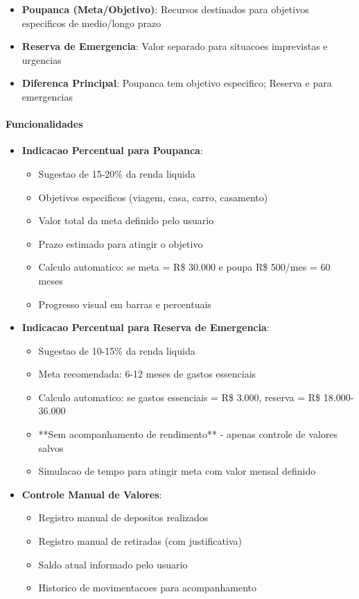 \begin{itemize}
    \item \textbf{Poupanca (Meta/Objetivo)}: Recursos destinados para objetivos especificos de medio/longo prazo
    \item \textbf{Reserva de Emergencia}: Valor separado para situacoes imprevistas e urgencias
    \item \textbf{Diferenca Principal}: Poupanca tem objetivo especifico; Reserva e para emergencias
\end{itemize}

\paragraph{Funcionalidades}
\begin{itemize}
    \item \textbf{Indicacao Percentual para Poupanca}:
    \begin{itemize}
        \item Sugestao de 15-20\% da renda liquida
        \item Objetivos especificos (viagem, casa, carro, casamento)
        \item Valor total da meta definido pelo usuario
        \item Prazo estimado para atingir o objetivo
        \item Calculo automatico: se meta = R\$ 30.000 e poupa R\$ 500/mes = 60 meses
        \item Progresso visual em barras e percentuais
    \end{itemize}
    
    \item \textbf{Indicacao Percentual para Reserva de Emergencia}:
    \begin{itemize}
        \item Sugestao de 10-15\% da renda liquida
        \item Meta recomendada: 6-12 meses de gastos essenciais
        \item Calculo automatico: se gastos essenciais = R\$ 3.000, reserva = R\$ 18.000-36.000
        \item **Sem acompanhamento de rendimento** - apenas controle de valores salvos
        \item Simulacao de tempo para atingir meta com valor mensal definido
    \end{itemize}
    
    \item \textbf{Controle Manual de Valores}:
    \begin{itemize}
        \item Registro manual de depositos realizados
        \item Registro manual de retiradas (com justificativa)
        \item Saldo atual informado pelo usuario
        \item Historico de movimentacoes para acompanhamento
    \end{itemize}
\end{itemize}

